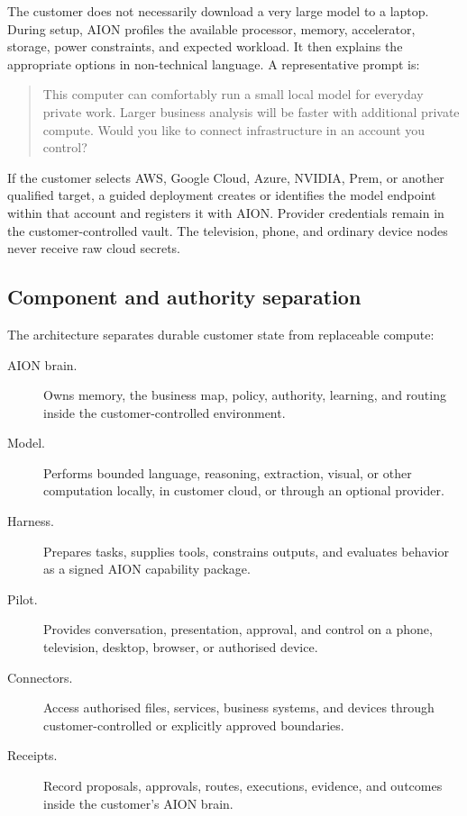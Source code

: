 The customer does not necessarily download a very large model to a laptop.
During setup, AION profiles the available processor, memory, accelerator,
storage, power constraints, and expected workload.  It then explains the
appropriate options in non-technical language.  A representative prompt is:

\begin{quote}
This computer can comfortably run a small local model for everyday private
work.  Larger business analysis will be faster with additional private compute.
Would you like to connect infrastructure in an account you control?
\end{quote}

If the customer selects AWS, Google Cloud, Azure, NVIDIA, Prem, or another
qualified target, a guided deployment creates or identifies the model endpoint
within that account and registers it with AION.  Provider credentials remain in
the customer-controlled vault.  The television, phone, and ordinary device
nodes never receive raw cloud secrets.

\subsection{Component and authority separation}

The architecture separates durable customer state from replaceable compute:

\begin{description}
  \item[AION brain.] Owns memory, the business map, policy, authority, learning,
        and routing inside the customer-controlled environment.
  \item[Model.] Performs bounded language, reasoning, extraction, visual, or
        other computation locally, in customer cloud, or through an optional
        provider.
  \item[Harness.] Prepares tasks, supplies tools, constrains outputs, and
        evaluates behavior as a signed AION capability package.
  \item[Pilot.] Provides conversation, presentation, approval, and control on
        a phone, television, desktop, browser, or authorised device.
  \item[Connectors.] Access authorised files, services, business systems, and
        devices through customer-controlled or explicitly approved boundaries.
  \item[Receipts.] Record proposals, approvals, routes, executions, evidence,
        and outcomes inside the customer's AION brain.
\end{description}

